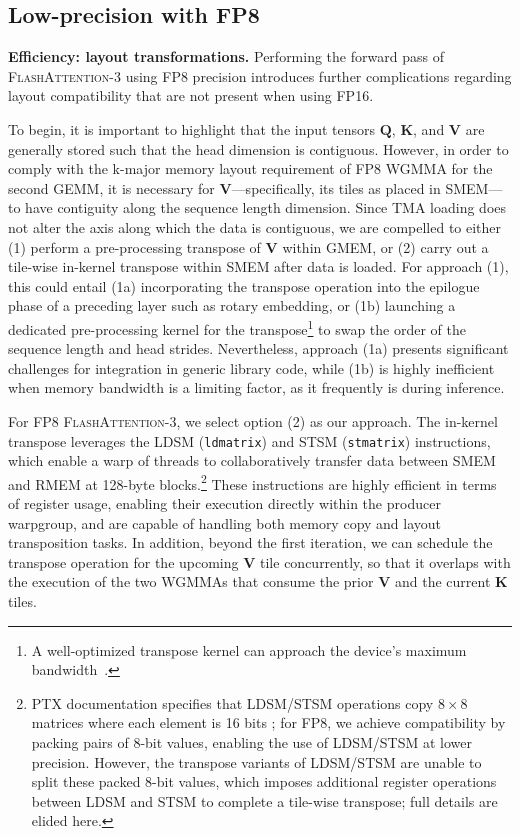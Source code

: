 \subsection{Low-precision with FP8}
\label{sec:algofp8}

\textbf{Efficiency: layout transformations.} Performing the forward pass of \textsc{FlashAttention-3} using FP8 precision introduces further complications regarding layout compatibility that are not present when using FP16.

To begin, it is important to highlight that the input tensors $\mathbf{Q}$, $\mathbf{K}$, and $\mathbf{V}$ are generally stored such that the head dimension is contiguous. However, in order to comply with the k-major memory layout requirement of FP8 WGMMA for the second GEMM, it is necessary for $\mathbf{V}$—specifically, its tiles as placed in SMEM—to have contiguity along the sequence length dimension. Since TMA loading does not alter the axis along which the data is contiguous, we are compelled to either (1) perform a pre-processing transpose of $\mathbf{V}$ within GMEM, or (2) carry out a tile-wise in-kernel transpose within SMEM after data is loaded. For approach (1), this could entail (1a) incorporating the transpose operation into the epilogue phase of a preceding layer such as rotary embedding, or (1b) launching a dedicated pre-processing kernel for the transpose\footnote{A well-optimized transpose kernel can approach the device’s maximum bandwidth~\citep{colfax_cutlass_transpose_2024}.} to swap the order of the sequence length and head strides. Nevertheless, approach (1a) presents significant challenges for integration in generic library code, while (1b) is highly inefficient when memory bandwidth is a limiting factor, as it frequently is during inference.

For FP8 \textsc{FlashAttention-3}, we select option (2) as our approach. The in-kernel transpose leverages the LDSM (\verb|ldmatrix|) and STSM (\verb|stmatrix|) instructions, which enable a warp of threads to collaboratively transfer data between SMEM and RMEM at 128-byte blocks.\footnote{PTX documentation specifies that LDSM/STSM operations copy $8 \times 8$ matrices where each element is 16 bits \cite[\S 9.7.13.4.15-16]{ptx}; for FP8, we achieve compatibility by packing pairs of 8-bit values, enabling the use of LDSM/STSM at lower precision. However, the transpose variants of LDSM/STSM are unable to split these packed 8-bit values, which imposes additional register operations between LDSM and STSM to complete a tile-wise transpose; full details are elided here.} These instructions are highly efficient in terms of register usage, enabling their execution directly within the producer warpgroup, and are capable of handling both memory copy and layout transposition tasks. In addition, beyond the first iteration, we can schedule the transpose operation for the upcoming $\mathbf{V}$ tile concurrently, so that it overlaps with the execution of the two WGMMAs that consume the prior $\mathbf{V}$ and the current $\mathbf{K}$ tiles.

